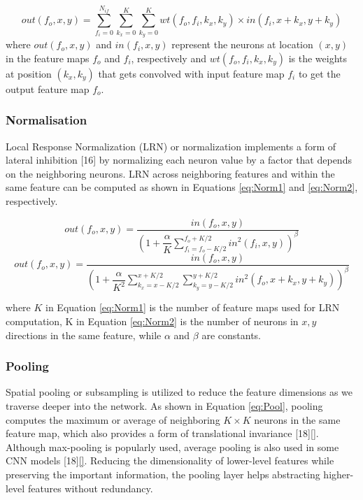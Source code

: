 \documentclass[11pt]{article}
\begin{document}
\begin{equation}
out(f_o,x,y)=\sum^{N_{if}}_{f_i=0} \sum^{K}_{k_x=0} \sum^{K}_{k_y=0} wt(f_o,f_i,k_x,k_y)\times in(f_i,x+k_x,y+k_y)
\label{eq:ConvLayer}
\end{equation}
where $out(f_o,x,y)$ and $in(f_i,x,y)$ represent the neurons at location $(x,y)$ in the feature maps $f_o$ and $f_i$, respectively and $wt(f_o,f_i,k_x,k_y)$ is the weights at position $(k_x,k_y)$ that gets convolved with input feature map $f_i$ to get the output feature map $f_o$.

\subsubsection{Normalisation}
\label{sec:Background-CNN-Norm}
Local Response Normalization (LRN) or normalization implements a form of lateral inhibition [16] by normalizing each neuron value by a factor that depends on the neighboring neurons. LRN across neighboring features and within the same feature can be computed as shown in Equations \ref{eq:Norm1} and \ref{eq:Norm2}, respectively.

\begin{equation}
out(f_o,x,y)= \dfrac{in(f_o,x,y)} {\left(1+\dfrac{\alpha}{K} \sum\limits^{f_o+K/2}_{f_i=f_o-K/2} {in}^2(f_i,x,y) \right) ^\beta}
\label{eq:Norm1}
\end{equation}
\begin{equation}
out(f_o,x,y)= \dfrac{in(f_o,x,y)} {\left(1+\dfrac{\alpha}{K^2} \sum\limits^{x+K/2}_{k_x=x-K/2} \sum\limits^{y+K/2}_{k_y=y-K/2} {in}^2(f_o,x+k_x,y+k_y) \right) ^\beta}
\label{eq:Norm2}
\end{equation}

where $K$ in Equation \ref{eq:Norm1} is the number of feature maps used for LRN computation, K in Equation \ref{eq:Norm2} is the number of neurons in $x, y$ directions in the same feature, while $\alpha$ and $\beta$ are constants.

\subsubsection{Pooling}
\label{sec:Background-CNN-Pool}

Spatial pooling or subsampling is utilized to reduce the feature dimensions as we traverse deeper into the network. As shown in Equation \ref{eq:Pool}, pooling computes the maximum or average of neighboring $K\times K$ neurons in the same feature map, which also provides a form of translational invariance [18]\ref{}. Although max-pooling is popularly used, average pooling is also used in some CNN models [18]\ref{}. Reducing the dimensionality of lower-level features while preserving the important information, the pooling layer helps abstracting higher-level features without redundancy.
\end{document}
